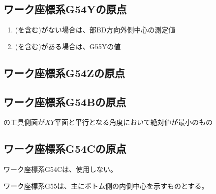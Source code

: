 \subsection{ワーク座標系{\ttfamily G54Y}の原点}
\begin{enumerate}[label*=\sarrow]
\item \BottomOutcut(\BottomCurvedOutcut を含む)がない場合は、\BottomEndFace 部BD方向外側中心の測定値
\item \BottomOutcut(\BottomCurvedOutcut を含む)がある場合は、{\ttfamily G55Y}の値
\end{enumerate}


\subsection{ワーク座標系{\ttfamily G54Z}の原点\TBW}


\subsection{ワーク座標系{\ttfamily G54B}の原点}
\Jig の工具側面が$XY$平面と平行となる角度において絶対値が最小のもの


\subsection{ワーク座標系{\ttfamily G54C}の原点}
ワーク座標系{\ttfamily G54C}は、使用しない。



\clearpage
ワーク座標系{\ttfamily G55}は、主にボトム側の内側中心を示すものとする。


